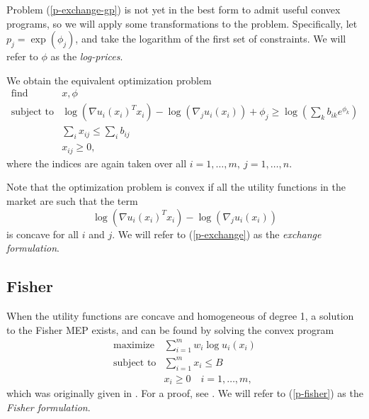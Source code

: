 \documentclass[12pt]{article}
\begin{document}
Problem (\ref{p-exchange-gp}) is not yet in the best form to admit useful
convex programs, so we will apply some transformations to the problem.
Specifically, let $p_j = \exp(\phi_j)$, and take the logarithm of the first set
of constraints. We will refer to $\phi$ as the \emph{log-prices}.

We obtain the equivalent optimization problem
\begin{equation}
\label{p-exchange}
\begin{array}{ll}
\mbox{find} & x, \phi \\
\mbox{subject to} & \log(\nabla u_i(x_i)^T x_i) - \log(\nabla_j u_i(x_i)) + \phi_j 
\geq \log(\sum_k b_{ik} e^{\phi_k})\\
& \sum_i x_{ij} \leq \sum_i b_{ij}\\
& x_{ij} \geq 0,
\end{array}
\end{equation}
where the indices are again taken over all $i=1,\ldots,m,\ j=1,\ldots,n$.

Note that the optimization problem is convex if all the utility functions
in the market are such that the term
\begin{equation}
\label{e-util-constraint}
\log(\nabla u_i(x_i)^T x_i) - \log(\nabla_j u_i(x_i))
\end{equation}
is concave for all $i$ and $j$.
We will refer to (\ref{p-exchange}) as the \emph{exchange formulation}.

\subsection{Fisher}
\label{sec:convex_form_fisher}

When the utility functions are concave and homogeneous of degree 1,
a solution to the Fisher MEP exists,
and can be found by solving the convex program
\begin{equation}
\label{p-fisher}
\begin{array}{ll}
\mbox{maximize} & \sum_{i=1}^m w_i \log u_i(x_i) \\
\mbox{subject to} & \sum_{i=1}^m x_i \leq B\\
& x_i \geq 0\quad i=1,\ldots,m,
\end{array}
\end{equation}
which was originally given in \cite{eisenberg1959consensus, gale1960theory,
eisenberg1961aggregation}. For a proof, see \cite[\S6.2]{nisan2007algorithmic}.
We will refer to (\ref{p-fisher}) as the \emph{Fisher formulation}.
\end{document}
